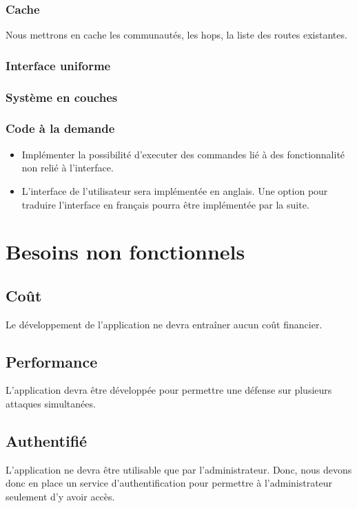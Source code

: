 \subsubsection{Cache}
Nous mettrons en cache les communautés, les hops, la liste des routes existantes.

\subsubsection{Interface uniforme}

\subsubsection{Système en couches}

\subsubsection{Code à la demande}
\begin{itemize}
    \item Implémenter la possibilité d'executer des commandes lié à des fonctionnalité non relié à l'interface.
    \item L'interface de l'utilisateur sera implémentée en anglais. Une option pour traduire l'interface en français pourra être implémentée par la suite.
\end{itemize}

\newpage

\section{Besoins non fonctionnels}

\subsection{Coût}
Le développement de l'application ne devra entraîner aucun coût financier.

\subsection{Performance}
L'application devra être développée pour permettre une défense sur plusieurs attaques simultanées. %

\subsection{Authentifié}
L’application ne devra être utilisable que par l'administrateur. Donc, nous devons donc en place un service d'authentification pour permettre à l'administrateur seulement d'y avoir accès.

